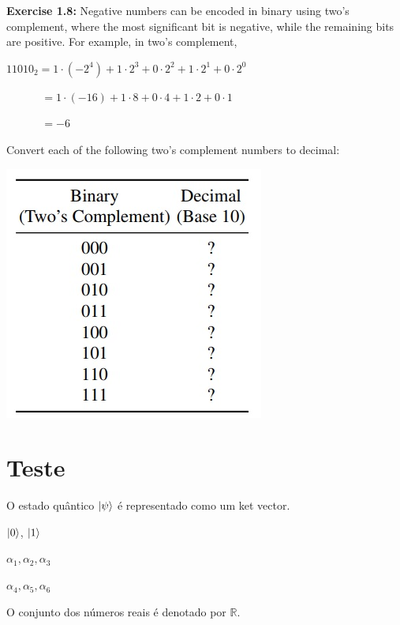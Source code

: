 \documentclass[12pt]{article}
\begin{document}
\textbf{Exercise 1.8:} Negative numbers can be encoded in binary using two’s complement, where the most significant bit is negative, while the remaining bits are positive. For example, in two’s complement, 

\(11010_{2} = 1 \cdot (-2^{4}) + 1 \cdot 2^{3} + 0 \cdot 2^{2} + 1 \cdot 2^{1} + 0 \cdot 2^{0}\)

\(\quad\quad\quad\,= 1 \cdot (-16) + 1 \cdot 8 + 0 \cdot 4 + 1 \cdot 2 + 0 \cdot 1\)

\(\quad\quad\quad\,= - 6 \)

Convert each of the following two’s complement numbers to decimal:

\begin{center}
	\includegraphics[width=0.5\linewidth]{figuras/exe_1-8}
\end{center}




\newpage
\section{Teste}

O estado quântico $\ket{\psi}$ é representado como um ket vector.

$\ket{0}$, $\ket{1}$

$\alpha_{1}, \alpha_{2}, \alpha_{3}$

\(\alpha_{4}, \alpha_{5}, \alpha_{6} \)

O conjunto dos números reais é denotado por $\mathbb{R}$.



\newpage

	
\end{document}
